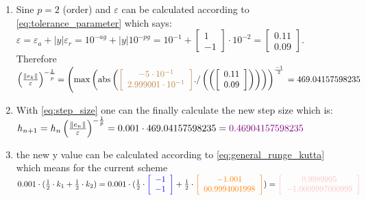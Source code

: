 \begin{enumerate}
    \item Sine $p=2$ (order) and $\varepsilon$ can be calculated according to \autoref{eq:tolerance_parameter} which says: $\varepsilon=\varepsilon_{a}+|y| \varepsilon_{r}=10^{-a g}+|y| 10^{-p g} = 10^{-1}+\left[\begin{array}{cc}
    1\\
    -1
    \end{array}\right] \cdot  10^{-2}=\left[\begin{array}{cc}
    0.11\\
    0.09
    \end{array}\right]$. Therefore $\left(\frac{\left\|e_k\right\|}{\varepsilon}\right)^{-\frac{1}{\widetilde{p}}}=\left(\max \left(\operatorname{abs}\left(\textcolor{brown}{\left[\begin{array}{cc}
    -5\cdot 10^{-1}\\ 
    2.999001\cdot 10^{-1}
    \end{array}\right]} ./\left(\left(\left[\begin{array}{l}
    0.11 \\
    0.09
    \end{array}\right]\right)\right)\right)\right)^{\frac{-1}{2}}\right.=469.04157598235$
    
    \item With \autoref{eq:step_size} one can the finally calculate the new step size which is: $h_{n+1}=h_{n}\left(\frac{\left\|e_{n}\right\|}{\varepsilon}\right)^{-\frac{1}{\bar{p}}}=0.001\cdot 469.04157598235=\textcolor{violet}{0.46904157598235}$
    
    \item the new y value can be calculated according to \autoref{eq:general_runge_kutta} which means for the current scheme $0.001\cdot (\frac{1}{2}\cdot k_1+\frac{1}{2}\cdot k_2)=0.001\cdot (\frac{1}{2}\cdot \textcolor{blue}{\left[\begin{array}{cc}
    -1\\
    -1
    \end{array}\right]}+\frac{1}{2}\cdot \textcolor{orange}{\left[\begin{array}{cc}
    -1.001\\ 
    00.9994001998
    \end{array}\right]})=\textcolor{pink}{\left[\begin{array}{cc}
    0.9989995\\ 
    -1.0009997000999
    \end{array}\right]}$
\end{enumerate}

